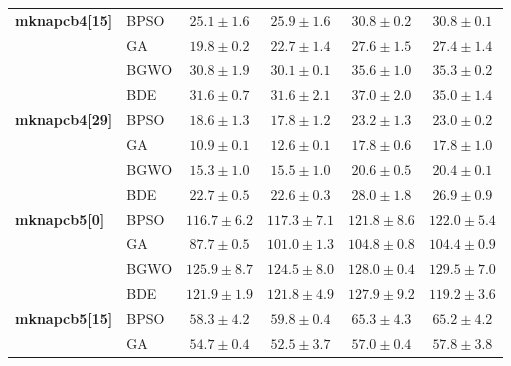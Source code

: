 \begin{table}[htbp]
\begin{tabular*}{\textwidth}{@{\extracolsep{\fill}}llcccc@{}}
    \midrule
    \textbf{mknapcb4[15]} & BPSO  &  $\mathbf{25.1 \pm 1.6}$ &           $25.9 \pm 1.6$ &           $30.8 \pm 0.2$ &           $30.8 \pm 0.1$ \\
                       & GA    &  $\mathbf{19.8 \pm 0.2}$ &           $22.7 \pm 1.4$ &           $27.6 \pm 1.5$ &           $27.4 \pm 1.4$ \\
                       & BGWO  &           $30.8 \pm 1.9$ &  $\mathbf{30.1 \pm 0.1}$ &           $35.6 \pm 1.0$ &           $35.3 \pm 0.2$ \\
                       & BDE   &  $\mathbf{31.6 \pm 0.7}$ &           $31.6 \pm 2.1$ &           $37.0 \pm 2.0$ &           $35.0 \pm 1.4$ \\
    \midrule
    \textbf{mknapcb4[29]} & BPSO  &           $18.6 \pm 1.3$ &  $\mathbf{17.8 \pm 1.2}$ &           $23.2 \pm 1.3$ &           $23.0 \pm 0.2$ \\
                       & GA    &  $\mathbf{10.9 \pm 0.1}$ &           $12.6 \pm 0.1$ &           $17.8 \pm 0.6$ &           $17.8 \pm 1.0$ \\
                       & BGWO  &  $\mathbf{15.3 \pm 1.0}$ &           $15.5 \pm 1.0$ &           $20.6 \pm 0.5$ &           $20.4 \pm 0.1$ \\
                       & BDE   &           $22.7 \pm 0.5$ &  $\mathbf{22.6 \pm 0.3}$ &           $28.0 \pm 1.8$ &           $26.9 \pm 0.9$ \\
    \midrule
    \textbf{mknapcb5[0]} & BPSO  & $\mathbf{116.7 \pm 6.2}$ &          $117.3 \pm 7.1$ &          $121.8 \pm 8.6$ &          $122.0 \pm 5.4$ \\
                       & GA    &  $\mathbf{87.7 \pm 0.5}$ &          $101.0 \pm 1.3$ &          $104.8 \pm 0.8$ &          $104.4 \pm 0.9$ \\
                       & BGWO  &          $125.9 \pm 8.7$ & $\mathbf{124.5 \pm 8.0}$ &          $128.0 \pm 0.4$ &          $129.5 \pm 7.0$ \\
                       & BDE   &          $121.9 \pm 1.9$ &          $121.8 \pm 4.9$ &          $127.9 \pm 9.2$ & $\mathbf{119.2 \pm 3.6}$ \\
    \midrule
    \textbf{mknapcb5[15]} & BPSO  &  $\mathbf{58.3 \pm 4.2}$ &           $59.8 \pm 0.4$ &           $65.3 \pm 4.3$ &           $65.2 \pm 4.2$ \\
                       & GA    &           $54.7 \pm 0.4$ &  $\mathbf{52.5 \pm 3.7}$ &           $57.0 \pm 0.4$ &           $57.8 \pm 3.8$ \\

\end{tabular*}
\end{table}
